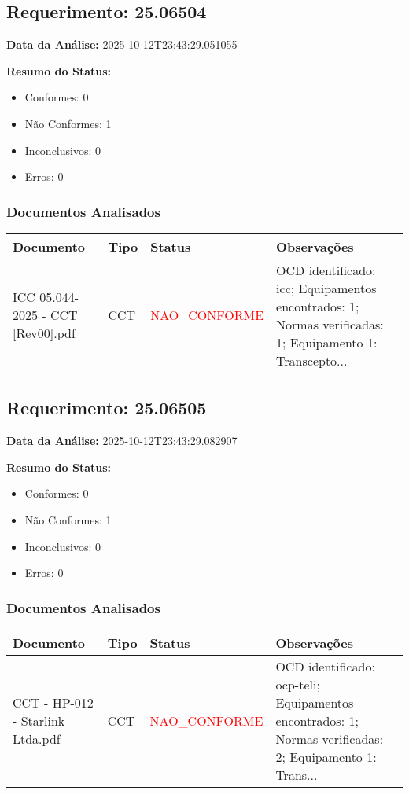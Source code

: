 \documentclass[12pt,a4paper]{article}
\begin{document}
\subsection{Requerimento: 25.06504}

\textbf{Data da Análise:} 2025-10-12T23:43:29.051055

\textbf{Resumo do Status:}
\begin{itemize}
    \item Conformes: 0
    \item Não Conformes: 1
    \item Inconclusivos: 0
    \item Erros: 0
\end{itemize}

\subsubsection{Documentos Analisados}

\begin{longtable}{|p{4cm}|p{2cm}|p{2cm}|p{6cm}|}
\hline
\textbf{Documento} & \textbf{Tipo} & \textbf{Status} & \textbf{Observações} \\
\hline
\endhead
ICC 05.044-2025 - CCT [Rev00].pdf & CCT & \textcolor{red}{NAO\_CONFORME} & OCD identificado: icc; Equipamentos encontrados: 1; Normas verificadas: 1; Equipamento 1: Transcepto... \\
\hline
\end{longtable}


\subsection{Requerimento: 25.06505}

\textbf{Data da Análise:} 2025-10-12T23:43:29.082907

\textbf{Resumo do Status:}
\begin{itemize}
    \item Conformes: 0
    \item Não Conformes: 1
    \item Inconclusivos: 0
    \item Erros: 0
\end{itemize}

\subsubsection{Documentos Analisados}

\begin{longtable}{|p{4cm}|p{2cm}|p{2cm}|p{6cm}|}
\hline
\textbf{Documento} & \textbf{Tipo} & \textbf{Status} & \textbf{Observações} \\
\hline
\endhead
CCT - HP-012 - Starlink Ltda.pdf & CCT & \textcolor{red}{NAO\_CONFORME} & OCD identificado: ocp-teli; Equipamentos encontrados: 1; Normas verificadas: 2; Equipamento 1: Trans... \\
\hline
\end{longtable}
\end{document}
